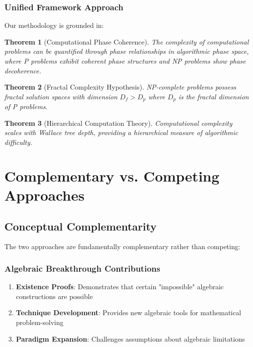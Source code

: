 \documentclass[12pt]{article}
\newtheorem{theorem}{Theorem}
\begin{document}
\subsubsection{Unified Framework Approach}
Our methodology is grounded in:

\begin{theorem}[Computational Phase Coherence]
The complexity of computational problems can be quantified through phase relationships in algorithmic phase space, where P problems exhibit coherent phase structures and NP problems show phase decoherence.
\end{theorem}

\begin{theorem}[Fractal Complexity Hypothesis]
NP-complete problems possess fractal solution spaces with dimension $D_f > D_p$ where $D_p$ is the fractal dimension of P problems.
\end{theorem}

\begin{theorem}[Hierarchical Computation Theory]
Computational complexity scales with Wallace tree depth, providing a hierarchical measure of algorithmic difficulty.
\end{theorem}

\section{Complementary vs. Competing Approaches}

\subsection{Conceptual Complementarity}

The two approaches are fundamentally complementary rather than competing:

\subsubsection{Algebraic Breakthrough Contributions}
\begin{enumerate}
    \item \textbf{Existence Proofs}: Demonstrates that certain "impossible" algebraic constructions are possible
    \item \textbf{Technique Development}: Provides new algebraic tools for mathematical problem-solving
    \item \textbf{Paradigm Expansion}: Challenges assumptions about algebraic limitations
\end{enumerate}
\end{document}
